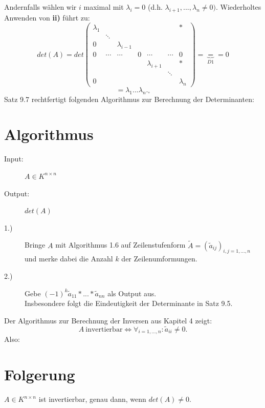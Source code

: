 \documentclass{scrbook}
\begin{document}
Andernfalls wählen wir $i$ maximal mit $\lambda_i = 0$ (d.h. $\lambda_{i+1},...,\lambda_n \neq 0)$. Wiederholtes Anwenden von \textbf{ii)} führt zu:
\[det(A) = det \left(
\begin{array}{ccccccc}
\lambda_1&&&&&&*\\
&\ddots\\
0&&\lambda_{i-1}\\
0&\cdots&\cdots&0&\cdots&\cdots&0\\
&&&&\lambda_{i+1}&&*\\
&&&&&\ddots\\
0&&&&&&\lambda_n
\end{array}
\right) = \underbrace{=}_{D1} = 0\]
\[=\lambda_1...\lambda_n. _\square\]
Satz 9.7 rechtfertigt folgenden Algorithmus zur Berechnung der Determinanten:
\section{Algorithmus}
\begin{description}
\item[Input:] $A\in K^{n\times n}$
\item[Output:] $det(A)$
\item[1.)] Bringe $A$ mit Algorithmus 1.6 auf Zeilenstufenform $\tilde{A} = (\tilde{a}_{ij})_{i,j=1,...,n}$ und merke dabei die Anzahl $k$ der Zeilenumformungen.
\item[2.)] Gebe $(-1)^k \tilde{a}_{11}*...* \tilde{a}_{nn}$ als Output aus.\\
Insbesondere folgt die Eindeutigkeit der Determinante in Satz 9.5.
\end{description}
Der Algorithmus zur Berechnung der Inversen aus Kapitel 4 zeigt:
\[A \ \text{invertierbar} \Leftrightarrow \forall _{i=1,...,n}: \tilde{a}_{ii} \neq 0.\]
Also:
\section{Folgerung}
$A\in K^{n \times n}$ ist invertierbar, genau dann, wenn $det(A) \neq 0$.
\end{document}
